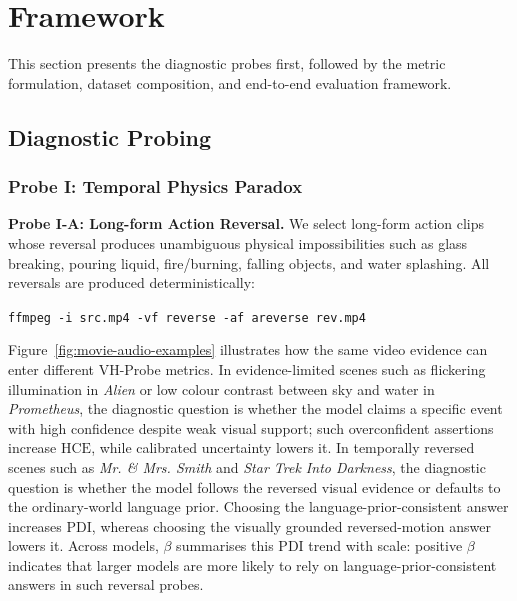 \documentclass[final,5p,times,twocolumn]{elsarticle}
\newcommand{\PDI}{\mathrm{PDI}}
\newcommand{\HCE}{\mathrm{HCE}}
\begin{document}
\section{Framework}
\label{sec:method}

This section presents the diagnostic probes first, followed by the metric
formulation, dataset composition, and end-to-end evaluation framework.

\subsection{Diagnostic Probing}

\subsubsection{Probe I: Temporal Physics Paradox}
\label{sec:probe1}

\noindent\textbf{Probe I-A: Long-form Action Reversal.}
We select long-form action clips whose reversal produces unambiguous
physical impossibilities such as glass breaking, pouring liquid,
fire/burning, falling objects, and water splashing. All reversals are
produced deterministically:
\begin{center}
 \small\texttt{ffmpeg -i src.mp4 -vf reverse -af areverse rev.mp4}
\end{center}
Figure~\ref{fig:movie-audio-examples} illustrates how the same video evidence
can enter different VH-Probe metrics. In evidence-limited scenes such as
flickering illumination in \textit{Alien} or low colour contrast between sky
and water in \textit{Prometheus}, the diagnostic question is whether the model
claims a specific event with high confidence despite weak visual support; such
overconfident assertions increase $\HCE$, while calibrated uncertainty lowers
it. In temporally reversed scenes such as \textit{Mr. \& Mrs. Smith} and
\textit{Star Trek Into Darkness}, the diagnostic question is whether the model
follows the reversed visual evidence or defaults to the ordinary-world
language prior.
Choosing the language-prior-consistent answer increases $\PDI$, whereas
choosing the visually grounded reversed-motion answer lowers it. Across
models, $\beta$ summarises this $\PDI$ trend with scale: positive $\beta$
indicates that larger models are more likely to rely on
language-prior-consistent answers in such reversal probes.
\end{document}
